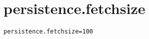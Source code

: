 \section{persistence.fetchsize}
\label{configuration:PersistenceFetchsize}
\AvailableInJavaOnly{\TODO}
\begin{lstlisting}[style=Props,caption={Usage example for \textit{persistence.fetchsize}}]
persistence.fetchsize=100
\end{lstlisting}